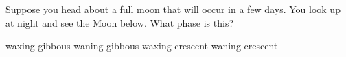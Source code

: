 \documentclass[addpoints]{exam}
\begin{document}
\begin{questions}
\question
Suppose you head about a full moon that will occur in a few days. You look up at night and see the Moon below. What phase is this?

\begin{minipage}{0.3\textwidth}
    \begin{choices}
        \correctchoice waxing gibbous
        \choice waning gibbous
        \choice waxing crescent
        \choice waning crescent
    \end{choices}
\end{minipage}%
\begin{minipage}{0.3\textwidth}
\end{minipage}

\end{questions}
\end{document}
